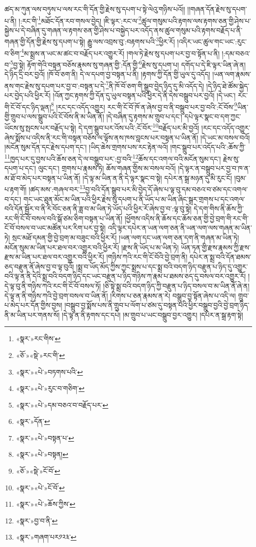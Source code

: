 ཚད་མ་ཀུན་ལས་བཏུས་པ་ལས་རང་གི་དོན་གྱི་རྗེས་སུ་དཔག་པ་སྟེ་ལེའུ་གཉིས་པའོ།། །།གཞན་དོན་རྗེས་སུ་དཔག་པ་ནི། །:རང་གི་\footnote{«སྣར་»རང་གིས་}མཐོང་དོན་རབ་གསལ་བྱེད། །ཇི་ལྟར་:རང་ལ་\footnote{«ཅོ་»«སྡེ་»རང་གི་}ཚུལ་གསུམ་པའི་རྟགས་ལས་རྟགས་ཅན་གྱི་ཤེས་པ་སྐྱེས་པ་དེ་བཞིན་དུ་གཞན་ལ་རྟགས་ཅན་གྱི་ཤེས་པ་བསྐྱེད་པར་འདོད་ནས་ཚུལ་གསུམ་པའི་རྟགས་བརྗོད་པ་ནི་གཞན་གྱི་དོན་གྱི་རྗེས་སུ་དཔག་པ་སྟེ། རྒྱུ་ལས་འབྲས་བུ་:བརྟགས་པའི་\footnote{«སྣར་»«པེ་»བཏགས་པའི་}ཕྱིར་རོ། །འདིར་ཡང་ཚུལ་གང་ཡང་:རུང་བ་ཅིག་\footnote{«སྣར་»«པེ་»རུང་བ་གཅིག་}མ་སྨྲས་ན་ཡང་མ་ཚང་བ་བརྗོད་པར་འགྱུར་རོ། །གལ་ཏེ་རྗེས་སུ་དཔག་པར་བྱ་བ་སྟོན་པ་ནི། །:དམ་བཅའ་བ་\footnote{«སྣར་»«པེ་»དམ་བཅའ་བ་བརྗོད་པར་}བྱ་སྟེ། རྟོག་གེའི་བསྟན་བཅོས་རྣམས་སུ་གཞན་གྱི་:དོན་གྱི་\footnote{«སྣར་»དོན་}རྗེས་སུ་དཔག་པ། དགོད་པ་དེ་ཇི་ལྟར་ཡིན་ཞེ་ན། དེ་ཉིད་དྲི་བར་བྱའོ། །ཁོ་བོ་ཅག་ནི། དེ་ལ་དཔག་བྱ་བསྟན་པ་ནི། །རྟགས་ཀྱི་དོན་གྱི་ཡུལ་དུ་འདོད། །ཡན་ལག་རྣམས་ནས་གང་རྗེས་སུ་དཔག་པར་བྱ་བ་:བསྟན་པ་དེ་\footnote{«སྣར་»«པེ་»བསྟན་པ་}ནི་ཁོ་བོ་ཅག་གི་སྒྲུབ་བྱེད་ཉིད་དུ་མི་འདོད་དེ། །དེ་ཉིད་ཐེ་ཚོམ་སྐྱེད་པར་བྱེད་པའི་ཕྱིར་རོ། །འོན་ཀྱང་རྟགས་ཀྱི་དོན་དུ་ཡུལ་བསྟན་པའི་ཕྱིར་དེ་ནི་དེས་བསྒྲུབ་པར་བྱའོ། །དེ་ཡང་། རང་གི་ངོ་བོ་དང་ཉིད་ལྡན།\footnote{«སྣར་»«པེ་»བསྟན།} །རང་དང་འདོད་འགྱུར། རང་གི་ངོ་བོ་ཁོ་ན་ཞེས་བྱ་བ་ནི་བསྒྲུབ་པར་བྱ་བའི་:ངོ་བོས་\footnote{«ཅོ་»«སྡེ་»ངོ་བོ་}ཡིན་གྱི་གྲུབ་པ་ལས་སྒྲུབ་པའི་ངོ་བོས་ནི་མ་ཡིན་ནོ། །དེ་བཞིན་དུ་རྟགས་མ་གྲུབ་པ་དང་། དཔེ་ལྟར་སྣང་བ་དག་ཀྱང་ཡོངས་སུ་སྤངས་པར་བརྗོད་པ་སྟེ། དེ་དག་སྒྲུབ་པར་འོས་པའི་:ངོ་བོར་\footnote{«སྣར་»«པེ་»ངོ་བོ་}བརྗོད་པར་མི་བྱའོ། །རང་དང་འདོད་འགྱུར་ཞེས་སྨོས་པ་འདིས་ནི་རང་གི་བསྟན་བཅོས་ལ་ལྟོས་ནས་ཁས་བླངས་པར་བསྟན་པ་ཡིན་ནོ། །དེ་ཡང་མ་བསལ་བའོ། །མངོན་སུམ་དོན་དང་རྗེས་དཔག་དང་། །ཡིད་ཆེས་གྲགས་པས་རང་རྟེན་ལའོ། །གང་སྒྲུབ་པར་འདོད་པའི་:ཆོས་ཀྱི་\footnote{«སྣར་»«པེ་»ཆོས་ཀྱིས་}ཁྱད་པར་དུ་བྱས་པའི་ཆོས་ཅན་དེ་ལ་བསྒྲུབ་པར་:བྱ་བའི་\footnote{«སྣར་»བྱ་བ་ནི་}ཆོས་དང་འགལ་བའི་མངོན་སུམ་དང་། རྗེས་སུ་དཔག་པ་དང་། ལུང་དང་། གྲགས་པ་རྣམས་ཏེ། ཆོས་གཞན་གྱིས་མ་བསལ་བའོ། །དེ་ལྟར་ན་བསྒྲུབ་པར་བྱ་བ་ཁ་ན་མ་ཐོ་བ་མེད་པར་བསྟན་པ་ཡིན་ནོ། །དེ་ལྟ་མ་ཡིན་ན་ནི་དེ་ལྟར་སྣང་བ་སྟེ། དཔེར་ན་སྒྲ་མཉན་དུ་མི་རུང་ངོ། །བུམ་པ་རྟག་གོ། །ཚད་མས་:གཞལ་བར་\footnote{«སྣར་»གཞག་པར༡༢༣་}བྱ་བའི་དོན་སྒྲུབ་པར་མི་བྱེད་དོ་ཞེས་པ་ལྟ་བུ་དམ་བཅའ་བ་ཙམ་དང་འགལ་བ་དང་། གང་ཡང་ཐུན་མོང་མ་ཡིན་པའི་ཕྱིར་རྗེས་སུ་དཔག་པ་ནི་ཡོད་པ་མ་ཡིན་ཞིང་སྒྲར་གྲགས་པ་དང་འགལ་བའི་དོན་སྦྱོར་བ་ནི་རི་བོང་ཅན་ནི་ཟླ་བ་མ་ཡིན་ཏེ་ཡོད་པའི་ཕྱིར་རོ་ཞེས་བྱ་བ་:ལྟ་བུ་སྟེ། དེ་དག་གིས་ནི་ཆོས་ཀྱི་རང་གི་ངོ་བོ་བསལ་བའི་སྒོ་ཙམ་ཅིག་བསྟན་པ་ཡིན་ནོ། །ཕྱོགས་འདིས་ནི་ཆོས་དང་ཆོས་ཅན་གྱི་བྱེ་བྲག་གི་རང་གི་ངོ་བོ་བསལ་བ་ཡང་མཚོན་པར་རིག་པར་བྱ་སྟེ། འདི་ལྟར་དཔེར་ན་ཡན་ལག་ཅན་ནི་ཡན་ལག་ལས་གཞན་མ་ཡིན་ཏེ། སྲང་མཐོ་དམན་གྱི་བྱེ་བྲག་མ་བཟུང་བའི་ཕྱིར་རོ། །ཡན་ལག་དང་ཡན་ལག་ཅན་དག་ནི་གཞན་མ་ཡིན་ཏེ། མངོན་སུམ་མ་ཡིན་པར་ཐལ་བར་འགྱུར་བའི་ཕྱིར་རོ། །རྫས་ནི་ཡོད་པ་མ་ཡིན་ཏེ། ཡོན་ཏན་གྱི་རྫས་རྣམས་ཀྱི་རྫས་རྫས་མ་ཡིན་པར་ཐལ་བར་འགྱུར་བའི་ཕྱིར་རོ། །གཉིས་ཀའི་རང་གི་ངོ་བོའི་བྱེ་བྲག་ནི། དཔེར་ན་སྨྲ་བའི་དོན་ཐམས་ཅད་བརྫུན་ནོ་ཞེས་བྱ་བ་ལྟ་བུའོ། །སྨྲ་བ་ཡོད་མོད་ཀྱིས་ཀྱང་སྨྲས་པ་དང་སྨྲ་བའི་བདག་ཉིད་བརྫུན་པ་ཉིད་དུ་འགྱུར་བའི་ལྟ་ན་ནི་དེའི་སྨྲ་བའི་བདག་ཉིད་དང་ཡང་བརྫུན་པ་ཉིད་གཉིས་ཀ་རྣམ་པ་ཐམས་ཅད་དུ་བསལ་བར་འགྱུར་རོ། །དེ་ལྟ་བུ་ནི་གཉིས་ཀའི་རང་གི་ངོ་བོ་བསལ་ཏོ། །ཅི་སྟེ་སྨྲ་བའི་བདག་ཉིད་ཀྱི་བརྫུན་པ་ཉིད་བསལ་བ་མ་ཡིན་ནོ་ཞེ་ན། དེ་ལྟ་ན་ནི་གཉིས་ཀའི་བྱེ་བྲག་བསལ་བ་ཡིན་ནོ། །རིགས་པ་ཅན་རྣམས་ན་རེ། བསྒྲུབ་བྱ་སྟོན་ཞེས་པ་འདི་ལ། གྲུབ་པ་མེད་པར་དོན་གྱིས་བྱས། །བསྒྲུབ་བྱ་སྨོས་པས་ནི་གྲུབ་པ་ལོག་པ་ཙམ་དུ་བསྟན་པའི་ཕྱིར་བསྒྲུབ་བྱའི་བྱེ་བྲག་ཉིད་ནི་མ་ཡིན་པར་གནས་སོ། །དེ་ལྟ་ན་ནི་རྟགས་དང་དཔེ། །མ་གྲུབ་པ་ཡང་བསྒྲུབ་བྱར་འགྱུར། །དཔེར་ན་སྒྲ་རྟག་སྟེ། 